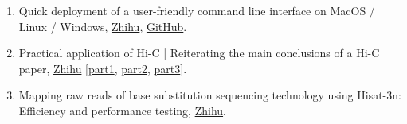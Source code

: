 \begin{enumerate}
    \item Quick deployment of a user-friendly command line interface on MacOS / Linux / Windows,
    \href{https://zhuanlan.zhihu.com/p/648520368}{Zhihu},
    \href{https://github.com/hermanzhaozzzz/.my_shell_envs}{GitHub}.
    \item Practical application of Hi-C | Reiterating the main conclusions of a Hi-C paper,
    \href{https://zhuanlan.zhihu.com/p/542713896}{Zhihu} [\href{https://zhuanlan.zhihu.com/p/542713896}{part1}, 
    \href{https://zhuanlan.zhihu.com/p/543987644}{part2},
    \href{https://zhuanlan.zhihu.com/p/545657147}{part3}].
    \item Mapping raw reads of base substitution sequencing technology using Hisat-3n: Efficiency and performance testing,
    \href{https://zhuanlan.zhihu.com/p/386371449}{Zhihu}.
\end{enumerate}